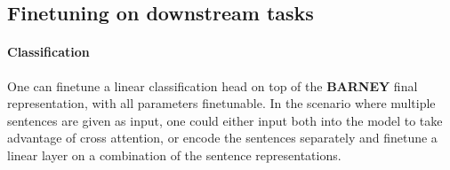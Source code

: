 



 
\subsection{Finetuning on downstream tasks} 

\paragraph{Classification} One can finetune a linear classification head on top of the \textbf{BARNEY} final representation, with all parameters finetunable. In the scenario where multiple sentences are given as input, one could either input both into the model to take advantage of cross attention, or encode the sentences separately and finetune a linear layer on a combination of the sentence representations.


